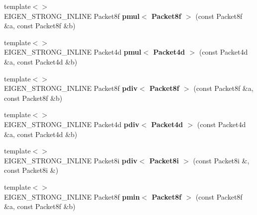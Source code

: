 \begin{DoxyCompactItemize}
\item 
\mbox{\label{namespace_eigen_1_1internal_ac7a893db9e575de48c02f4804ad87343}} 
{\footnotesize template$<$$>$ }\\E\+I\+G\+E\+N\+\_\+\+S\+T\+R\+O\+N\+G\+\_\+\+I\+N\+L\+I\+NE Packet8f {\bfseries pmul$<$ Packet8f $>$} (const Packet8f \&a, const Packet8f \&b)
\item 
\mbox{\label{namespace_eigen_1_1internal_a889b4dcfc3caf6b69927924a3b3fbea9}} 
{\footnotesize template$<$$>$ }\\E\+I\+G\+E\+N\+\_\+\+S\+T\+R\+O\+N\+G\+\_\+\+I\+N\+L\+I\+NE Packet4d {\bfseries pmul$<$ Packet4d $>$} (const Packet4d \&a, const Packet4d \&b)
\item 
\mbox{\label{namespace_eigen_1_1internal_adf8d60701f303c98cf4709d383162609}} 
{\footnotesize template$<$$>$ }\\E\+I\+G\+E\+N\+\_\+\+S\+T\+R\+O\+N\+G\+\_\+\+I\+N\+L\+I\+NE Packet8f {\bfseries pdiv$<$ Packet8f $>$} (const Packet8f \&a, const Packet8f \&b)
\item 
\mbox{\label{namespace_eigen_1_1internal_a622c3dbbbc5b3c177eee96851496756c}} 
{\footnotesize template$<$$>$ }\\E\+I\+G\+E\+N\+\_\+\+S\+T\+R\+O\+N\+G\+\_\+\+I\+N\+L\+I\+NE Packet4d {\bfseries pdiv$<$ Packet4d $>$} (const Packet4d \&a, const Packet4d \&b)
\item 
\mbox{\label{namespace_eigen_1_1internal_a6906c3e9018564d1d537e7b523eada6f}} 
{\footnotesize template$<$$>$ }\\E\+I\+G\+E\+N\+\_\+\+S\+T\+R\+O\+N\+G\+\_\+\+I\+N\+L\+I\+NE Packet8i {\bfseries pdiv$<$ Packet8i $>$} (const Packet8i \&, const Packet8i \&)
\item 
\mbox{\label{namespace_eigen_1_1internal_a50a454380904ca403618aed14024def4}} 
{\footnotesize template$<$$>$ }\\E\+I\+G\+E\+N\+\_\+\+S\+T\+R\+O\+N\+G\+\_\+\+I\+N\+L\+I\+NE Packet8f {\bfseries pmin$<$ Packet8f $>$} (const Packet8f \&a, const Packet8f \&b)
\item 
\mbox{\label{namespace_eigen_1_1internal_ab95e2515c19afd9141f9d26ec44e1d3a}} 

\end{DoxyCompactItemize}
